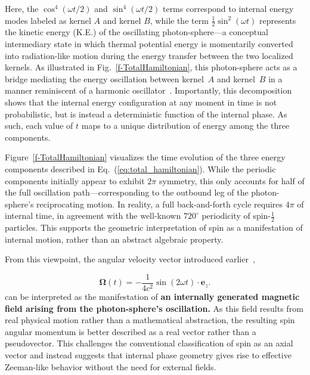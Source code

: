 \documentclass[%
 reprint,
 amsmath,amssymb,
 aps,
]{revtex4-1}
\numberwithin{equation}{section}%
\begin{document}
Here, the $\cos^4(\omega t/2)$ and $\sin^4(\omega t/2)$ terms correspond to internal energy modes labeled as kernel $A$ and kernel $B$, while the term $\frac{1}{2} \sin^2(\omega t)$ represents the kinetic energy (K.E.) of the oscillating photon-sphere---a conceptual intermediary state in which thermal potential energy is momentarily converted into radiation-like motion during the energy transfer between the two localized kernels. As illustrated in Fig.~\ref{f-TotalHamiltonian}, this photon-sphere acts as a bridge mediating the energy oscillation between kernel~$A$ and kernel~$B$ in a manner reminiscent of a harmonic oscillator~\cite{hanamura2411.0117}. Importantly, this decomposition shows that the internal energy configuration at any moment in time is not probabilistic, but is instead a deterministic function of the internal phase. As such, each value of $t$ maps to a unique distribution of energy among the three components. 

Figure~\ref{f-TotalHamiltonian} visualizes the time evolution of the three energy components described in Eq.~(\ref{eq:total_hamiltonian}). While the periodic components initially appear to exhibit $2\pi$ symmetry, this only accounts for half of the full oscillation path—corresponding to the outbound leg of the photon-sphere's reciprocating motion. In reality, a full back-and-forth cycle requires $4\pi$ of internal time, in agreement with the well-known $720^\circ$ periodicity of spin-$\frac{1}{2}$ particles. This supports the geometric interpretation of spin as a manifestation of internal motion, rather than an abstract algebraic property.

From this viewpoint, the angular velocity vector introduced earlier~\cite{hanamura2411.0117},

\begin{equation}
    \boldsymbol{\Omega}(t) = -\frac{1}{4c^2} \sin(2\omega t) \cdot \boldsymbol{e}_z.
    \label{eq:angular_velocity}
\end{equation}
can be interpreted as the manifestation of \textbf{an internally generated magnetic field arising from the photon-sphere's oscillation.} As this field results from real physical motion rather than a mathematical abstraction, the resulting spin angular momentum is better described as a real vector rather than a pseudovector. This challenges the conventional classification of spin as an axial vector and instead suggests that internal phase geometry gives rise to effective Zeeman-like behavior without the need for external fields.
\end{document}
